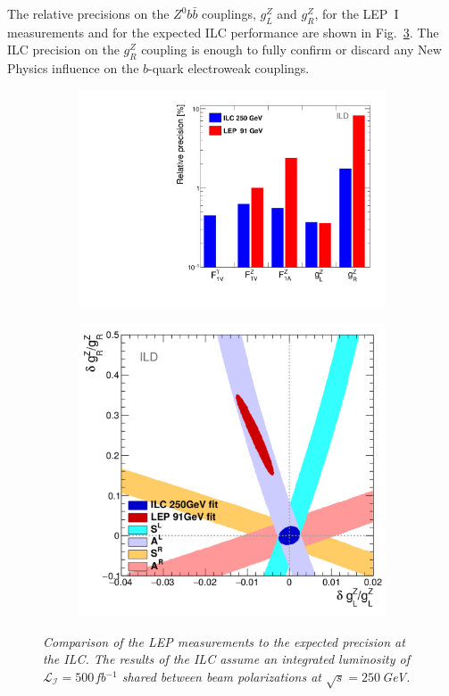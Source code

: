 \documentclass{PoS}
\begin{document}
The relative precisions on the $Z^0b\bar{b}$ couplings, $g_L^Z$ and $g_R^Z$, for the LEP~I measurements and for the expected ILC performance are shown in Fig.~\ref{fig:LEPILCResult_3}. 
The ILC precision on the $g_R^Z$ coupling is enough to fully confirm or discard any New Physics influence on the $b$-quark electroweak couplings. 


\begin{figure}
	\centering
	\begin{subfigure}{0.5\textwidth}
		\includegraphics[width=0.95\linewidth]{../poster/plots/final-graph-ild.pdf}
		\caption{\label{fig:LEPILCResult_3_a} }
	\end{subfigure}%
	\begin{subfigure}{0.5\textwidth}
		\centering
		\includegraphics[width=0.95\linewidth]{../poster/plots/ilc-precision-ild.png}
		\caption{\label{fig:LEPILCResult_3_b} }
	\end{subfigure}
	\caption{\sl  Comparison of the LEP measurements to the expected precision at the ILC. The results of the ILC assume an integrated luminosity of $\mathcal{L_I} = 500$\,fb$^{-1}$ shared between beam polarizations at $\sqrt{s} = 250$\,GeV. }
	\label{fig:LEPILCResult_3}
\end{figure}
\end{document}
